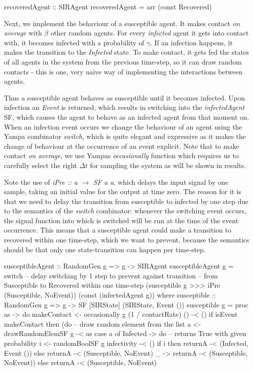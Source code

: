 \begin{HaskellCode}
recoveredAgent :: SIRAgent
recoveredAgent = arr (const Recovered)
\end{HaskellCode}

Next, we implement the behaviour of a susceptible agent. It makes contact \textit{on average} with $\beta$ other random agents. For every \textit{infected} agent it gets into contact with, it becomes infected with a probability of $\gamma$. If an infection happens, it makes the transition to the \textit{Infected} state. To make contact, it gets fed the states of all agents in the system from the previous time-step, so it can draw random contacts - this is one, very naive way of implementing the interactions between agents.

Thus a susceptible agent behaves as susceptible until it becomes infected. Upon infection an \textit{Event} is returned, which results in switching into the \textit{infectedAgent} SF, which causes the agent to behave as an infected agent from that moment on. When an infection event occurs we change the behaviour of an agent using the Yampa combinator \textit{switch}, which is quite elegant and expressive as it makes the change of behaviour at the occurrence of an event explicit. Note that to make contact \textit{on average}, we use Yampas \textit{occasionally} function which requires us to carefully select the right $\Delta t$ for sampling the system as will be shown in results. 

Note the use of \textit{iPre :: a $\rightarrow$ SF a a}, which delays the input signal by one sample, taking an initial value for the output at time zero. The reason for it is that we need to delay the transition from susceptible to infected by one step due to the semantics of the \textit{switch} combinator: whenever the switching event occurs, the signal function into which is switched will be run at the time of the event occurrence. This means that a susceptible agent could make a transition to recovered within one time-step, which we want to prevent, because the semantics should be that only one state-transition can happen per time-step.

\begin{HaskellCode}
susceptibleAgent :: RandomGen g => g -> SIRAgent
susceptibleAgent g 
    = switch 
      -- delay switching by 1 step to prevent against transition
      -- from Susceptible to Recovered within one time-step
      (susceptible g >>> iPre (Susceptible, NoEvent)) 
      (const (infectedAgent g))
  where
    susceptible :: RandomGen g => g -> SF [SIRState] (SIRState, Event ())
    susceptible g = proc as -> do
      makeContact <- occasionally g (1 / contactRate) () -< ()
      if isEvent makeContact
        then (do
          -- draw random element from the list
          a <- drawRandomElemSF g -< as
          case a of
            Infected -> do
              -- returns True with given probability
              i <- randomBoolSF g infectivity -< ()
              if i
                then returnA -< (Infected, Event ())
                else returnA -< (Susceptible, NoEvent)
             _       -> returnA -< (Susceptible, NoEvent))
        else returnA -< (Susceptible, NoEvent)
\end{HaskellCode}

